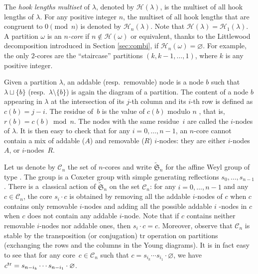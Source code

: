 \documentclass[pdftex]{sigma}
\numberwithin{equation}{section}
\def\cch{\mathcal H}
\begin{document}
 The \textit{hook lengths multiset} of $\lambda$, denoted by $\mathcal{H}(\lambda)$, is the multiset of all hook lengths of $\lambda$. For any positive integer $n$, the multiset of all hook lengths that are congruent to $0 \pmod n$ is denoted by $\mathcal{H}_n(\lambda)$. Note that $\mathcal{H}(\lambda)=\mathcal{H}_1(\lambda)$. A partition $\omega$ is an \textit{$n$-core} if $n\not\in \cch(\omega)$ or equivalent, thanks to the Littlewood decomposition introduced in Section \ref{sec:combi}, if $\cch_n(\omega)=\varnothing$. For example, the only $2$-cores are the ``staircase'' partitions $(k,k-1,\dots,1)$, where $k$ is any positive integer.

Given a partition $\lambda $, an addable (resp.\ removable) node is a
node $b$ such that $\lambda \sqcup \{b\}$ (resp.~${\lambda \setminus \{b\}}$)
is again the diagram of a partition. The content of a node $b$ appearing in $%
\lambda $ at the intersection of its $j$-th column and its $i$-th row is
defined as $c(b)=j-i$. The residue of~$b$ is the value of $c(b)$ modulo $n$%
, that is, $r(b)=c(b)\bmod n$. The nodes with the same residue~$i$ are
called the $i$-nodes of $\lambda $. It is then easy to check that for any $%
i=0,\dots ,n-1$, an $n$-core cannot contain a mix of addable ($A$) and
removable ($R$) $i$-nodes: they are either $i$-nodes $A$, or $i$-nodes~$R$.

Let us denote by $\mathcal{C}_{n}$ the set of $n$-cores and write $%
\widetilde{\mathfrak{S}}_{n}$ for the affine Weyl group of type .
The group  is a Coxeter group
with simple generating reflections $s_{0},\dots ,s_{n-1}$. There is
a~classical action of $\widetilde{\mathfrak{S}}_{n}$ on the set $\mathcal{C}%
_{n}$: for any $i=0,\dots ,n-1$ and any $c\in \mathcal{C}_{n}$, the core $%
s_{i}\cdot c$ is obtained by removing all the addable $i$-nodes of $c$ when $%
c$ contains only removable $i$-nodes and adding all the possible addable $i$%
-nodes in $c$ when $c$ does not contain any addable $i$-node. Note that if $c$ contains neither removable $i$-nodes nor addable ones, then $%
s_{i}\cdot c=c$. Moreover, observe that $%
\mathcal{C}_{n}$ is stable by the transposition (or conjugation) $\mathrm{tr}
$ operation on partitions (exchanging the rows and the columns in the Young
diagrams). It is in fact easy to see that for any core~${c\in \mathcal{C}_{n}}$
such that $c=s_{i_{k}}\cdots s_{i_{1}}\cdot \varnothing $, we have $c^{\mathrm{%
tr}}=s_{n-i_{k}}\cdots s_{n-i_{1}}\cdot \varnothing $.
\end{document}
